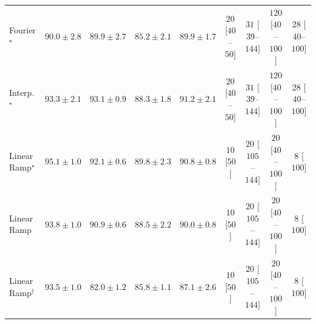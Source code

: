 \begin{tabular}{l|cccc|cccc|}
Fourier$^\star$ & {\cellcolor[HTML]{0B713B}} \color[HTML]{F1F1F1} $90.0\pm 2.8$ & {\cellcolor[HTML]{0B713B}} \color[HTML]{F1F1F1} $89.9\pm 2.7$ & {\cellcolor[HTML]{288A47}} \color[HTML]{F1F1F1} $85.2\pm 2.1$ & {\cellcolor[HTML]{0B713B}} \color[HTML]{F1F1F1} $89.9\pm 1.7$ & {\cellcolor[HTML]{FFF3EF}} \color[HTML]{000000} $20$ [$40$--$50$] & {\cellcolor[HTML]{FEF1ED}} \color[HTML]{000000} $31$ [$39$--$144$] & {\cellcolor[HTML]{FDDAD7}} \color[HTML]{000000} $120$ [$40$--$100$] & {\cellcolor[HTML]{FEF1ED}} \color[HTML]{000000} $28$ [$40$--$100$] \\
Interp.$^\star$ & {\cellcolor[HTML]{005E33}} \color[HTML]{F1F1F1} $93.3\pm 2.1$ & {\cellcolor[HTML]{005F34}} \color[HTML]{F1F1F1} $93.1\pm 0.9$ & {\cellcolor[HTML]{15793E}} \color[HTML]{F1F1F1} $88.3\pm 1.8$ & {\cellcolor[HTML]{036B38}} \color[HTML]{F1F1F1} $91.2\pm 2.1$ & {\cellcolor[HTML]{FFF3EF}} \color[HTML]{000000} $20$ [$40$--$50$] & {\cellcolor[HTML]{FEF1ED}} \color[HTML]{000000} $31$ [$39$--$144$] & {\cellcolor[HTML]{FDDAD7}} \color[HTML]{000000} $120$ [$40$--$100$] & {\cellcolor[HTML]{FEF1ED}} \color[HTML]{000000} $28$ [$40$--$100$] \\
Linear Ramp$^\star$ & {\cellcolor[HTML]{00532F}} \color[HTML]{F1F1F1} $95.1\pm 1.0$ & {\cellcolor[HTML]{006636}} \color[HTML]{F1F1F1} $92.1\pm 0.6$ & {\cellcolor[HTML]{0C723B}} \color[HTML]{F1F1F1} $89.8\pm 2.3$ & {\cellcolor[HTML]{066D39}} \color[HTML]{F1F1F1} $90.8\pm 0.8$ & {\cellcolor[HTML]{FFF6F2}} \color[HTML]{000000} $10$ [$50$] & {\cellcolor[HTML]{FFF3EF}} \color[HTML]{000000} $20$ [$105$--$144$] & {\cellcolor[HTML]{FFF3EF}} \color[HTML]{000000} $20$ [$40$--$100$] & {\cellcolor[HTML]{FFF6F2}} \color[HTML]{000000} $8$ [$100$] \\
Linear Ramp & {\cellcolor[HTML]{005B32}} \color[HTML]{F1F1F1} $93.8\pm 1.0$ & {\cellcolor[HTML]{056C39}} \color[HTML]{F1F1F1} $90.9\pm 0.6$ & {\cellcolor[HTML]{14783E}} \color[HTML]{F1F1F1} $88.5\pm 2.2$ & {\cellcolor[HTML]{0B713B}} \color[HTML]{F1F1F1} $90.0\pm 0.8$ & {\cellcolor[HTML]{FFF6F2}} \color[HTML]{000000} $10$ [$50$] & {\cellcolor[HTML]{FFF3EF}} \color[HTML]{000000} $20$ [$105$--$144$] & {\cellcolor[HTML]{FFF3EF}} \color[HTML]{000000} $20$ [$40$--$100$] & {\cellcolor[HTML]{FFF6F2}} \color[HTML]{000000} $8$ [$100$] \\
Linear Ramp$^\dagger$ & {\cellcolor[HTML]{005D33}} \color[HTML]{F1F1F1} $93.5\pm 1.0$ & {\cellcolor[HTML]{39A056}} \color[HTML]{F1F1F1} $82.0\pm 1.2$ & {\cellcolor[HTML]{248644}} \color[HTML]{F1F1F1} $85.8\pm 1.1$ & {\cellcolor[HTML]{1D7F41}} \color[HTML]{F1F1F1} $87.1\pm 2.6$ & {\cellcolor[HTML]{FFF6F2}} \color[HTML]{000000} $10$ [$50$] & {\cellcolor[HTML]{FFF3EF}} \color[HTML]{000000} $20$ [$105$--$144$] & {\cellcolor[HTML]{FFF3EF}} \color[HTML]{000000} $20$ [$40$--$100$] & {\cellcolor[HTML]{FFF6F2}} \color[HTML]{000000} $8$ [$100$] \\

\end{tabular}
